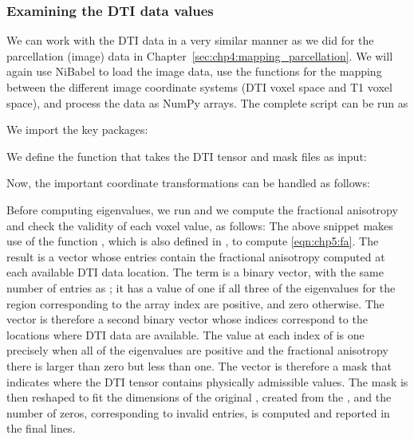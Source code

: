 \subsubsection*{Examining the DTI data values}
We can work with the DTI data in a very similar manner as we did
for the parcellation (image) data in
Chapter~\ref{sec:chp4:mapping_parcellation}. We will again use NiBabel
to load the image data, use the  functions for the mapping
between the different image coordinate systems (DTI voxel space and T1
voxel space), and process the data as NumPy arrays. The complete
script can be run as

We import the key packages:

\noindent We define the function  that takes the DTI
tensor and mask files as input: 

\noindent Now, the important coordinate transformations can be handled as follows:

\noindent Before computing eigenvalues, we run
and we compute the fractional anisotropy and check the validity of each voxel value, as follows:
The above snippet makes use of the function , which is also 
defined in , to compute \eqref{eqn:chp5:fa}.  The result is 
a vector  whose entries contain the fractional anisotropy computed at 
each available DTI data location. The term  is a binary vector, with the 
same number of entries as ; it has a value of one if all three of the eigenvalues 
for the region corresponding to the array index are positive, and zero otherwise. 
The vector  is therefore a second binary vector whose indices correspond 
to the locations where DTI data are available.  The value at each index of  
is one precisely when all of the eigenvalues are positive and the fractional anisotropy 
there is larger than zero but less than one.  The  vector is therefore 
a mask that indicates where the DTI tensor contains physically admissible values.
The  mask is then reshaped to fit the dimensions of the original 
, created from the , and the number of zeros, 
corresponding to invalid entries, is computed and reported in the final lines.


